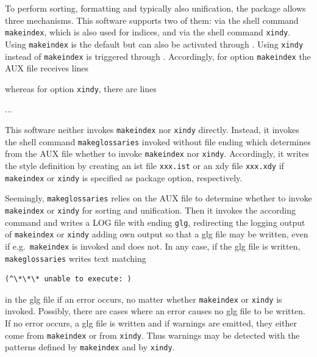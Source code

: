 To perform sorting, formatting and typically also unification, 
the package  allows three mechanisms. 
This software supports two of them: 
via the shell command \texttt{makeindex}, which is also used for indices, 
and via the shell command \texttt{xindy}. 
Using \texttt{makeindex} is the default but can also be activated through 
. 
Using \texttt{xindy} instead of \texttt{makeindex} is triggered through 
. 
Accordingly, for option \texttt{makeindex} the AUX file receives lines 
%
\begin{taglstlisting}[language=TeX]
\providecommand\@istfilename[1]{}
\@istfilename{manualLMP.ist}
\end{taglstlisting}
%
whereas for option \texttt{xindy}, there are lines 
%
\begin{taglstlisting}[language=TeX]
\providecommand\@istfilename[1]{}
\@istfilename{manualLMP.xdy}
...
\providecommand\@xdylanguage[2]{}
\@xdylanguage{main}{english}
\providecommand\@gls@codepage[2]{}
\@gls@codepage{main}{}
\end{taglstlisting}



This software neither invokes \texttt{makeindex} nor \texttt{xindy} directly. 
Instead, it invokes the shell command \texttt{makeglossaries}
invoked without file ending  
which determines from the AUX file 
whether to invoke \texttt{makeindex} nor \texttt{xindy}. 
Accordingly, it writes the style definition 
by creating an ist file \texttt{xxx.ist} or an xdy file \texttt{xxx.xdy} 
if \texttt{makeindex} or \texttt{xindy} is specified as package option, 
respectively. 

Seemingly, \texttt{makeglossaries} relies on the AUX file 
to determine whether to invoke \texttt{makeindex} or \texttt{xindy} 
for sorting and unification. 
Then it invokes the according command and writes a LOG file 
with ending \texttt{glg}, 
redirecting the logging output of \texttt{makeindex} or \texttt{xindy} 
adding own output so that a glg file may be written, 
even if e.g.~\texttt{makeindex} is invoked and does not. 
In any case, if the glg file is written, 
\texttt{makeglossaries} writes text matching 
%
\begin{verbatim}
(^\*\*\* unable to execute: )
\end{verbatim}
%
in the glg file if an error occurs, 
no matter whether \texttt{makeindex} or \texttt{xindy} is invoked. 
Possibly, there are cases where an error causes no glg file to be written. 
If no error occurs, a glg file is written 
and if warnings are emitted, 
they either come from \texttt{makeindex} or from \texttt{xindy}. 
Thus warnings may be detected with the patterns 
defined by \texttt{makeindex} and by \texttt{xindy}. 

